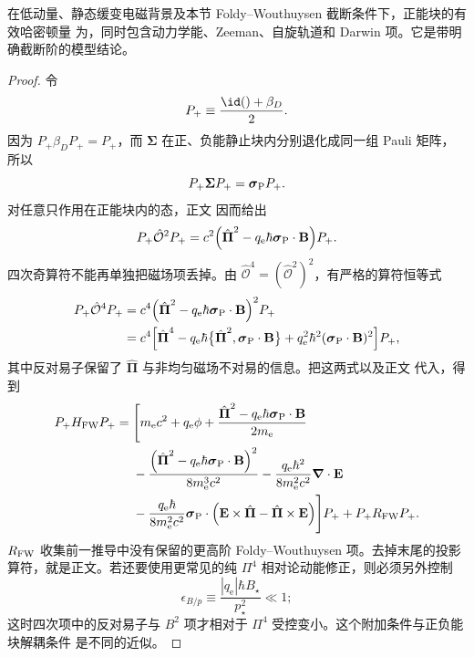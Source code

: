 \begin{proposition}
在低动量、静态缓变电磁背景及本节 Foldy--Wouthuysen 截断条件下，正能块的有效哈密顿量 为，同时包含动力学能、Zeeman、自旋轨道和 Darwin 项。它是带明确截断阶的模型结论。
\end{proposition}
\begin{proof}
令
\[
P_+\equiv\frac{\id()+\beta_D}{2}.
\]
因为 $P_+\beta_D P_+=P_+$，而 $\boldsymbol\Sigma$ 在正、负能静止块内分别退化成同一组 Pauli 矩阵，所以
\[
P_+\boldsymbol\Sigma P_+
=\boldsymbol\sigma_{\rm P}P_+.
\]
对任意只作用在正能块内的态，正文 因而给出
\[
P_+\hat{\mathcal O}^2P_+
=c^2\Bigl(
\hat{\boldsymbol\Pi}^2
-q_{\mathrm e}\hbar\boldsymbol\sigma_{\rm P}\cdot\mathbf B
\Bigr)P_+.
\]
四次奇算符不能再单独把磁场项丢掉。由 $\hat{\mathcal O}^4=(\hat{\mathcal O}^2)^2$，有严格的算符恒等式
\begin{align*}
P_+\hat{\mathcal O}^4P_+
={}&c^4
\Bigl(
\hat{\boldsymbol\Pi}^2
-q_{\mathrm e}\hbar\boldsymbol\sigma_{\rm P}\cdot\mathbf B
\Bigr)^2P_+\\
={}&c^4\Bigl[
\hat{\boldsymbol\Pi}^4
-q_{\mathrm e}\hbar\bigl\{
\hat{\boldsymbol\Pi}^2,
\boldsymbol\sigma_{\rm P}\cdot\mathbf B
\bigr\}
+q_{\mathrm e}^2\hbar^2
(\boldsymbol\sigma_{\rm P}\cdot\mathbf B)^2
\Bigr]P_+,
\end{align*}
其中反对易子保留了 $\hat{\boldsymbol\Pi}$ 与非均匀磁场不对易的信息。把这两式以及正文 代入，得到
\begin{align*}
P_+H_{\rm FW}P_+
={}&\Biggl[
m_{\mathrm e} c^2+q_{\mathrm e}\phi
+\frac{\hat{\boldsymbol\Pi}^2-q_{\mathrm e}\hbar\boldsymbol\sigma_{\rm P}\cdot\mathbf B}{2m_{\mathrm e}}\\
&-\frac{\left(\hat{\boldsymbol\Pi}^2-q_{\mathrm e}\hbar\boldsymbol\sigma_{\rm P}\cdot\mathbf B\right)^2}{8m_{\mathrm e}^3c^2}
-\frac{q_{\mathrm e}\hbar^2}{8m_{\mathrm e}^2c^2}\boldsymbol\nabla\cdot\mathbf E\\
&-\frac{q_{\mathrm e}\hbar}{8m_{\mathrm e}^2c^2}
\boldsymbol\sigma_{\rm P}\cdot
\left(
\mathbf E\times\hat{\boldsymbol\Pi}
-\hat{\boldsymbol\Pi}\times\mathbf E
\right)
\Biggr]P_+ + P_+R_{\rm FW}P_+ .
\end{align*}
$R_{\rm FW}$ 收集前一推导中没有保留的更高阶 Foldy--Wouthuysen 项。去掉末尾的投影算符，就是正文。若还要使用更常见的纯 $\Pi^4$ 相对论动能修正，则必须另外控制
\[
\epsilon_{B/p}
\equiv
\frac{|q_{\mathrm e}|\hbar B_\star}{p_\star^2}\ll1;
\]
这时四次项中的反对易子与 $B^2$ 项才相对于 $\Pi^4$ 受控变小。这个附加条件与正负能块解耦条件 是不同的近似。
\end{proof}

